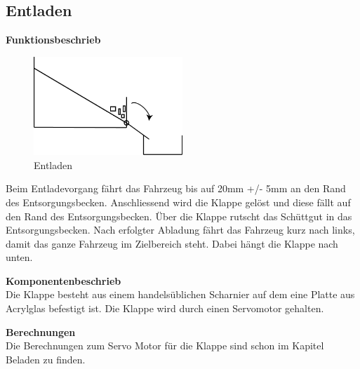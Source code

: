 \subsection{Entladen}

\textbf{Funktionsbeschrieb}\\[0.2cm]
\begin{figure}[H]
\centering
\includegraphics[width=0.5\textwidth]{03_Loesungskonzept/pictures/Entladen_Schraegbehaelter.png}
\caption{Entladen}
\end{figure}

Beim Entladevorgang fährt das Fahrzeug bis auf 20mm +/- 5mm an den Rand des Entsorgungsbecken. Anschliessend wird die Klappe gelöst und diese fällt auf den Rand des Entsorgungsbecken. Über die Klappe rutscht das Schüttgut in das Entsorgungsbecken. Nach erfolgter Abladung fährt das Fahrzeug kurz nach links, damit das ganze Fahrzeug im Zielbereich steht. Dabei hängt die Klappe nach unten.

\textbf{Komponentenbeschrieb}\\[0.2cm]
Die Klappe besteht aus einem handelsüblichen Scharnier auf dem eine Platte aus Acrylglas befestigt ist.
Die Klappe wird durch einen Servomotor gehalten.

\textbf{Berechnungen}\\[0.2cm]
Die Berechnungen zum Servo Motor für die Klappe sind schon im Kapitel Beladen zu finden.